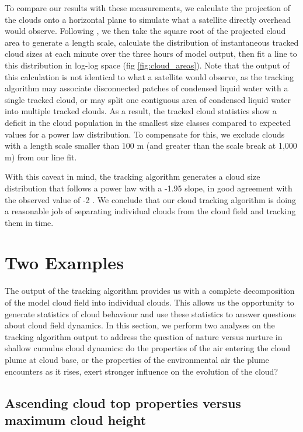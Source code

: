 \documentclass[acp]{copernicus}
\begin{document}
To compare our results with these measurements, we calculate the projection of 
the clouds onto a horizontal plane to simulate what a satellite directly 
overhead would observe.  Following \cite{Zhao2007}, we then take the square 
root of the projected cloud area to generate a length scale, calculate the 
distribution of instantaneous tracked cloud sizes at each minute over the three 
hours of model output, then fit a line to this distribution in log-log space 
(fig \ref{fig:cloud_areas}).  Note that the output of this calculation is not 
identical to what a satellite would observe, as the tracking algorithm may 
associate disconnected patches of condensed liquid water with a single tracked 
cloud, or may split one contiguous area of condensed liquid water into multiple 
tracked clouds.  As a result, the tracked cloud statistics show a deficit in 
the cloud population in the smallest size classes compared to expected values 
for a power law distribution.  To compensate for this, we exclude clouds with a 
length scale smaller than 100 m (and greater than the scale break at 1,000 m) 
from our line fit.

With this caveat in mind, the tracking algorithm generates a cloud size 
distribution that follows a power law with a -1.95 slope, in good agreement 
with the observed value of -2 \citep{Zhao2007}.  We conclude that our cloud 
tracking algorithm is doing a reasonable job of separating individual clouds 
from the cloud field and tracking them in time.


\section{Two Examples}

The output of the tracking algorithm provides us with a complete decomposition 
of the model cloud field into individual clouds.  This allows us the 
opportunity to generate statistics of cloud behaviour and use these statistics 
to answer questions about cloud field dynamics.  In this section, we perform 
two analyses on the tracking algorithm output to address the question of nature 
versus nurture in shallow cumulus cloud dynamics: do the properties of the 
air entering the cloud plume at cloud base, or the properties of the 
environmental air the plume encounters as it rises, exert stronger influence on 
the evolution of the cloud?

\subsection{Ascending cloud top properties versus maximum cloud height}
\end{document}
